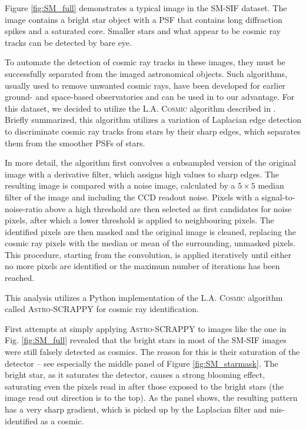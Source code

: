 \documentclass[a4paper, 11pt]{article}
\begin{document}
Figure \ref{fig:SM_full} demonstrates a typical image in the SM-SIF dataset. The image contains a bright star object with a PSF that contains long diffraction spikes and a saturated core. Smaller stars and what appear to be cosmic ray tracks can be detected by bare eye.

To automate the detection of cosmic ray tracks in these images, they must be successfully separated from the imaged astronomical objects. Such algorithms, usually used to remove unwanted cosmic rays, have been developed for earlier ground- and space-based observatories and can be used in to our advantage. For this dataset, we decided to utilize the \textsc{L.A. Cosmic} algorithm described in \cite{Dokkum_cosmics}. Briefly summarized, this algorithm utilizes a variation of Laplacian edge detection to discriminate cosmic ray tracks from stars by their sharp edges, which separates them from the smoother PSFs of stars.

In more detail, the algorithm first convolves a subsampled version of the original image with a derivative filter, which assigns high values to sharp edges. The resulting image is compared with a noise image, calculated by a $5 \times 5$ median filter of the image and including the CCD readout noise. Pixels with a signal-to-noise-ratio above a high threshold are then selected as first candidates for noise pixels, after which a lower threshold is applied to neighbouring pixels. The identified pixels are then masked and the original image is cleaned, replacing the cosmic ray pixels with the median or mean of the surrounding, unmasked pixels. This procedure, starting from the convolution, is applied iteratively until either no more pixels are identified or the maximum number of iterations has been reached.

This analysis utilizes a Python implementation of the \textsc{L.A. Cosmic} algorithm called \textsc{Astro-SCRAPPY} \cite{astroscrappy} for cosmic ray identification.

First attempts at simply applying \textsc{Astro-SCRAPPY} to images like the one in Fig. \ref{fig:SM_full} revealed that the bright stars in most of the SM-SIF images were still falsely detected as cosmics. The reason for this is their saturation of the detector -- see especially the middle panel of Figure \ref{fig:SM_starmask}. The bright star, as it saturates the detector, causes a strong blooming effect, saturating even the pixels read in after those exposed to the bright stars (the image read out direction is to the top). As the panel shows, the resulting pattern has a very sharp gradient, which is picked up by the Laplacian filter and mis-identified as a cosmic.
\end{document}
